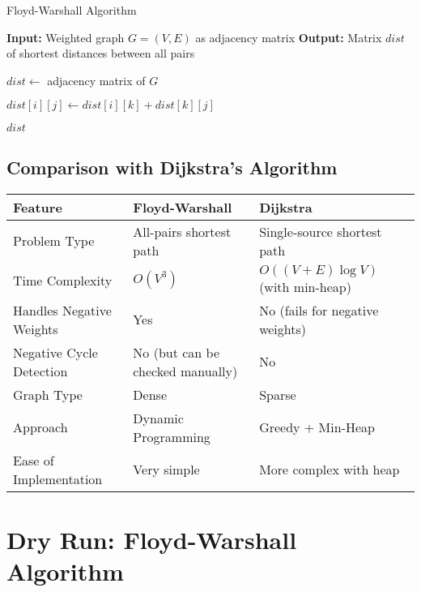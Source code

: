 \documentclass[14pt,a4paper]{extarticle}
\begin{document}
\begin{algorithm}[H]
\caption{Floyd-Warshall Algorithm}
\begin{algorithmic}[1]
\State \textbf{Input:} Weighted graph $G = (V, E)$ as adjacency matrix
\State \textbf{Output:} Matrix $dist$ of shortest distances between all pairs

    \State $dist \gets$ adjacency matrix of $G$
    
                    \State $dist[i][j] \gets dist[i][k] + dist[k][j]$
                \EndIf
            \EndFor
        \EndFor
    \EndFor
    
    \State \Return $dist$
\EndFunction
\end{algorithmic}
\end{algorithm}

\subsection{Comparison with Dijkstra's Algorithm}
\begin{table}[H]
\centering
\renewcommand{\arraystretch}{1.3}
\begin{tabular}{|p{5.2cm}|p{5.5cm}|p{5.5cm}|}
\hline
\textbf{Feature} & \textbf{Floyd-Warshall} & \textbf{Dijkstra} \\
\hline
Problem Type & All-pairs shortest path & Single-source shortest path \\
\hline
Time Complexity & $O(V^3)$ & $O((V+E)\log V)$ (with min-heap) \\
\hline
Handles Negative Weights & Yes & No (fails for negative weights) \\
\hline
Negative Cycle Detection & No (but can be checked manually) & No \\
\hline
Graph Type & Dense & Sparse \\
\hline
Approach & Dynamic Programming & Greedy + Min-Heap \\
\hline
Ease of Implementation & Very simple & More complex with heap \\
\hline
\end{tabular}
\end{table}

\section{Dry Run: Floyd-Warshall Algorithm}
\end{document}
